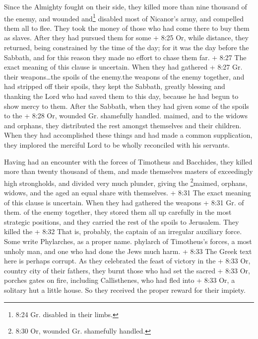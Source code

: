  Since the Almighty fought on their side, they killed more
than nine thousand of the enemy, and wounded and\footnote{8:24 Gr.
  disabled in their limbs.} disabled most of Nicanor's army, and
compelled them all to flee.  They took the money of those
who had come there to buy them as slaves. After they had pursued them
for some + 8:25 Or, while distance, they returned, being constrained by
the time of the day;  for it was the day before the
Sabbath, and for this reason they made no effort to chase them far.
 + 8:27 The exact meaning of this clause is uncertain. When
they had gathered + 8:27 Gr. their weapons\ldots the spoils of the
enemy.the weapons of the enemy together, and had stripped off their
spoils, they kept the Sabbath, greatly blessing and thanking the Lord
who had saved them to this day, because he had begun to show mercy to
them.  After the Sabbath, when they had given some of the
spoils to the + 8:28 Or, wounded Gr. shamefully handled. maimed, and to
the widows and orphans, they distributed the rest amongst themselves and
their children.  When they had accomplished these things
and had made a common supplication, they implored the merciful Lord to
be wholly reconciled with his servants.

 Having had an encounter with the forces of Timotheus and
Bacchides, they killed more than twenty thousand of them, and made
themselves masters of exceedingly high strongholds, and divided very
much plunder, giving the \footnote{8:30 Or, wounded Gr. shamefully
  handled.}maimed, orphans, widows, and the aged an equal share with
themselves.  + 8:31 The exact meaning of this clause is
uncertain. When they had gathered the weapons + 8:31 Gr. of them. of the
enemy together, they stored them all up carefully in the most strategic
positions, and they carried the rest of the spoils to Jerusalem.
 They killed the + 8:32 That is, probably, the captain of
an irregular auxiliary force. Some write Phylarches, as a proper name.
phylarch of Timotheus's forces, a most unholy man, and one who had done
the Jews much harm.  + 8:33 The Greek text here is perhaps
corrupt. As they celebrated the feast of victory in the + 8:33 Or,
country city of their fathers, they burnt those who had set the sacred +
8:33 Or, porches gates on fire, including Callisthenes, who had fled
into + 8:33 Or, a solitary hut a little house. So they received the
proper reward for their impiety.

